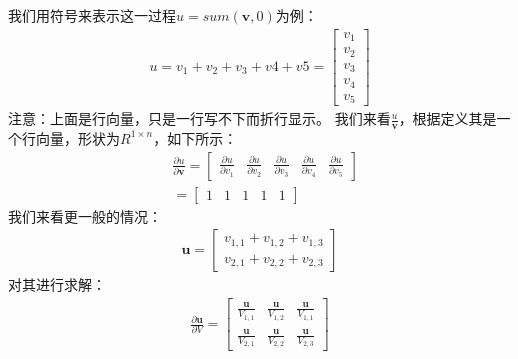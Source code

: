我们用符号来表示这一过程$u=sum(\boldsymbol{v}, 0)$为例：
\begin{equation}
\begin{aligned}
u=v_{1} + v_{2} + v_{3} + v{4} + v{5}=\begin{bmatrix}
	v_{1} \\
	v_{2} \\
	v_{3} \\
	v_{4} \\ 
	v_{5}
\end{bmatrix}
\end{aligned}
\label{chpZ01-sum-dim-0-example}
\end{equation}
注意：上面是行向量，只是一行写不下而折行显示。
我们来看$\frac{u}{\boldsymbol{v}}$，根据定义其是一个行向量，形状为$R^{1 \times n}$，如下所示：
\begin{equation}
\begin{aligned}
& \frac{\partial{u}}{\partial{\boldsymbol{v}}} = \begin{bmatrix}
	\frac{\partial{u}}{\partial{v_{1}}} & \frac{\partial{u}}{\partial{v_{2}}} 
	& \frac{\partial{u}}{\partial{v_{3}}} & \frac{\partial{u}}{\partial{v_{4}}}
	& \frac{\partial{u}}{\partial{v_{5}}}
\end{bmatrix} \\
& =\begin{bmatrix}
	1 & 1 & 1 & 1 & 1
\end{bmatrix}
\end{aligned}
\label{chpZ01-sum-dim-0-pu-pv}
\end{equation}
我们来看更一般的情况：
\begin{equation}
\begin{aligned}
\boldsymbol{u}=\begin{bmatrix}
	v_{1,1} + v_{1,2} + v_{1,3} \\
	v_{2,1} + v_{2,2} + v_{2,3} 
\end{bmatrix}
\end{aligned}
\label{chpZ01-sum-dim-0-example-1}
\end{equation}
对其进行求解：
\begin{equation}
\begin{aligned}
\frac{\partial{\boldsymbol{u}}}{\partial{V}}=\begin{bmatrix}
	\frac{\boldsymbol{u}}{V_{1,1}} & \frac{\boldsymbol{u}}{V_{1,2}} & \frac{\boldsymbol{u}}{V_{1,1}}\\
	\frac{\boldsymbol{u}}{V_{2,1}} & \frac{\boldsymbol{u}}{V_{2,2}} & \frac{\boldsymbol{u}}{V_{2,3}}
\end{bmatrix}
\end{aligned}
\label{chpZ01-sum-dim-0-pu-pv-1}
\end{equation}
